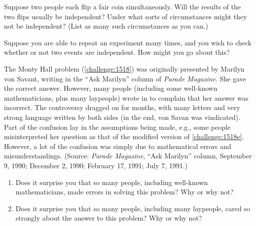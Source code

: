 \begin{discussion}
    \item Suppose two people each flip a fair coin simultaneously. Will the results of the two flips usually be independent? Under what sorts of circumstances might they not be independent? (List as many such circumstances as you can.)
    \item Suppose you are able to repeat an experiment many times, and you wish to check whether or not two events are independent. How might you go about this?
    \item The Monty Hall problem (\autoref{challenge:1518}) was originally presented by Marilyn von Savant, writing in the ``Ask Marilyn'' column of \emph{Parade Magazine}. She gave the correct answer. However, many people (including some well-known mathematicians, plus many laypeople) wrote in to complain that her answer was incorrect. The controversy dragged on for months, with many letters and very strong language written by both sides (in the end, von Savan was vindicated). Part of the confusion lay in the assumptions being made, e.g., some people misinterpreted her question as that of the modified version of \autoref{challenge:1518e}. However, a lot of the confusion was simply due to mathematical errors and misunderstandings. (Source: \emph{Parade Magazine}, ``Ask Marilyn'' column, September 9, 1990; December 2, 1990; February 17, 1991; July 7, 1991.)
    \begin{enumerate}
        \item Does it surprise you that so many people, including well-known mathematicians, made errors in  solving this problem? Why or why not?
        \item Does it surprise you that so many people, including many laypeople, cared so strongly about the answer to this problem? Why or why not?
    \end{enumerate}
\end{discussion}
